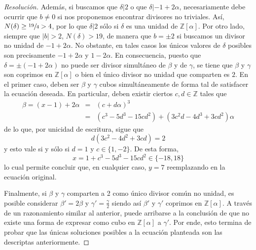 \documentclass[a4paper,11pt]{article}
\newcommand{\Zm}[1]{\ensuremath{\mathbb{Z}[#1]}}
\newcommand{\Div}[2]{\ensuremath{#1 | #2}}
\begin{document}
\begin{proof}[Resoluci\'on]
Además, si buscamos que $\Div{\delta}{2}$ o que \Div{\delta}{-1 + 2\alpha}, necesariamente debe ocurrir 
que $b \neq 0$ si nos proponemos encontrar divisores no triviales.
Así, $N(\delta) \geq \sfrac{19}{4} > 4$, por lo que $\Div{\delta}{2}$ sólo si $\delta$ es una
unidad de \Zm{\alpha}. Por otro lado, siempre que $|b| > 2$, $N(\delta) > 19$, de manera que $b = \pm 2$
si buscamos un divisor no unidad de $-1 + 2\alpha$. No obstante, en tales casos los únicos valores de $\delta$
posibles son precisamente $-1 + 2\alpha$ y $1 - 2\alpha$. En consecuencia, puesto que 
$\delta = \pm (-1 + 2\alpha)$ no puede ser divisor simultáneo de $\beta$ y de $\gamma$,
se tiene que $\beta$ y $\gamma$ son coprimos en \Zm{\alpha} o bien el único divisor no unidad que comparten
es $2$. En el primer caso, deben ser $\beta$ y $\gamma$ cubos simultáneamente de forma tal de satisfacer
la ecuación deseada. En particular, deben existir ciertos $c, d \in \mathbb{Z}$ tales que
\begin{eqnarray*}
    \beta = (x-1) + 2\alpha &=& (c + d \alpha)^3 \\
          &=& \left(c^3 - 5d^3 - 15cd^2 \right) + \left(3c^2d - 4d^3 + 3cd^2 \right) \alpha
\end{eqnarray*}
de lo que, por unicidad de escritura, sigue que
$$d (3c^2 - 4d^2 + 3cd) = 2$$
y esto vale si y sólo si $d = 1$ y $c \in \{1, -2\}$. De esta forma, 
$$x = 1 + c^3 - 5d^3 - 15cd^2 \in \{-18, 18\}$$
lo cual permite concluir que, en cualquier caso, $y = 7$ reemplazando en la ecuación original.

Finalmente, si $\beta$ y $\gamma$ comparten a 2 como único divisor común no unidad, es posible considerar
$\beta'= 2\beta$ y $\gamma' = \frac{\gamma}{2}$ siendo así $\beta'$ y $\gamma'$ coprimos en \Zm{\alpha}.
A través de un razonamiento similar al anterior, puede arribarse a la conclusión de que no existe una
forma de expresar como cubo en \Zm{\alpha} a $\gamma'$. Por ende, esto termina de probar que las 
únicas soluciones posibles a la ecuación planteada son las descriptas anteriormente.
\end{proof}
\end{document}
